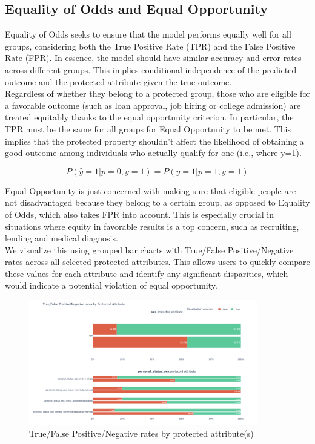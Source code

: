 \documentclass[runningheads]{llncs}
\begin{document}
\subsection{Equality of Odds and Equal Opportunity}
Equality of Odds seeks to ensure that the model performs equally well for all groups, considering both the True Positive Rate (TPR) and the False Positive Rate (FPR). In essence, the model should have similar accuracy and error rates across different groups. This implies conditional independence of the predicted outcome and the protected attribute given the true outcome. \\

Regardless of whether they belong to a protected group, those who are eligible for a favorable outcome (such as loan approval, job hiring or college admission) are treated equitably thanks to the equal opportunity criterion. In particular, the TPR must be the same for all groups for Equal Opportunity to be met. This implies that the protected property shouldn't affect the likelihood of obtaining a good outcome among individuals who actually qualify for one (i.e., where y=1).

\begin{equation} 
P(\hat{y} = 1 | p=0, y=1) = P(\hat{y} = 1 | p=1, y=1) 
\end{equation}

Equal Opportunity is just concerned with making sure that eligible people are not disadvantaged because they belong to a certain group, as opposed to Equality of Odds, which also takes FPR into account. This is especially crucial in situations where equity in favorable results is a top concern, such as recruiting, lending and medical diagnosis.\\

We visualize this using grouped bar charts with True/False Positive/Negative rates across all selected protected attributes. This allows users to quickly compare these values for each attribute and identify any significant disparities, which would indicate a potential violation of equal opportunity.

\begin{figure}
\centering
\includegraphics[width=0.89\textwidth]{images/true-false-outcomes.png}
\caption{True/False Positive/Negative rates by protected attribute(s)} \label{true-false-outcomes}
\end{figure}
\end{document}

